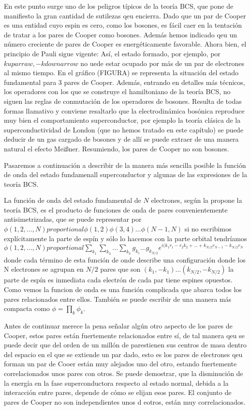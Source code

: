 En este punto surge uno de los peligros típicos de la teoría BCS, que pone de manifiesto la gran cantidad de sutilezas qeu encierra. Dado que un par de Cooper es una entidad cuyo espin es cero, como los bosones, es fácil caer en la tentación de tratar a los pares de Cooper como bosones. Además hemos indicado qeu un número creciente de pares de Cooper es energéticamente favorable. Ahora bien, el principio de Pauli sigue vigente: Así, el estado formado, por ejemplo, por $k uparraw, -k downarrow$ no uede estar ocupado por más de un par de electrones al mismo tiempo. En el gráfico (FIGURA) se representa la situación del estado fundamental para 3 pares de Cooper. Además, entrando en detalles más técnicos, los operadores con los que se construye el hamiltoniano de la teoría BCS, no siguen las reglas de conmutación de los operadores de bosones. Resulta de todas formas llamativo y conviene resaltarlo que la electrodinámica bosónica reproduce muy bien el comportamiento superconductor, por ejemplo la teoría clásica de la superconductividad de London (que no hemos tratado en este capítulo) se puede deducir de un gas cargado de bosones y de allí se puede extraer de una manera natural el efecto Meißner. Resumiendo, los pares de Cooper no son bosones.

Pasaremos a continuación a describir de la manera más sencilla posible la función de onda del estado fundamenall superconductor y algunas de las expresiones de la teoría BCS.

La función de onda del estado fundamental de $N$ electrones, según la propone la teoría BCS, es el producto de funciones de onda de pares convenientemente antisimetrizadas, que se puede representar por $\phi(1,2,...,N) proportional \phi(1,2)\phi(3,4)...\phi(N-1,N)$ si no escribimos explícitamente la parte de espín y sólo lo hacemos con la parte orbital tendríamos $\phi(1,2,...,N) proportional \sum\limits_{k_1} \sum\limits_{k_2} ... \sum\limits_{k_3} g_{k_1} ... g_{k_{N/2}} e^{i (k_1 r_1 - r_2 k_2 + ... + k_{N/2} r_{N-1} - k_{N/2} r_N}$ donde cada término de esta función de onde describe una configuración donde los N electrones se agrupan en $N/2$ pares que son $(k_1, -k_1) ... (k_{N/2}, -k_{N/2})$ la parte de espín es inmediata cada electrón de cada par tiene espines opuestos. Como vemos la funcion de onda es una función complicada que abarca todos los pares relacionados entre ellos. También se puede escribir de una manera más compacta como $\phi = \prod\limits_k \phi_k$.

Antes de continuar merece la pena señalar algún otro aspecto de los pares de Cooper, estos pares están fuertemente relacionados entre sí, de tal manera qeu se puede decir que del orden de un millón de parestienen sus centros de masa dentro del espacio en el que se extiende un par dado, esto es los pares de electrones qeu forman un par de Cooer están muy alejados uno del otro, estando fuertemente correlacionados unos pares con otros. Se puede demostrar, que la disminución de la energía en la fase superconductora respecto al estado normal, debida a la interacción entre pares, depende de cómo se elijan esos pares. El conjunto de pares de Cooper no son independientes unos d eotros, están muy correlacionados.

